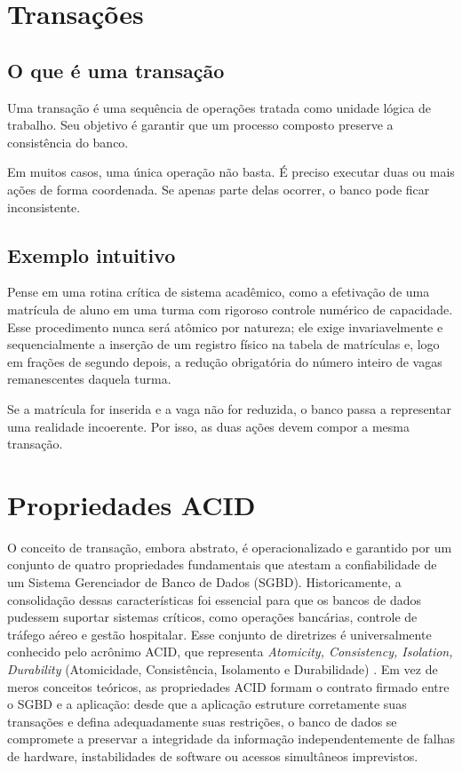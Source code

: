 \section{Transações}

\subsection{O que é uma transação}

Uma transação é uma sequência de operações tratada como unidade lógica de trabalho. Seu objetivo é garantir que um processo composto preserve a consistência do banco.

Em muitos casos, uma única operação não basta. É preciso executar duas ou mais ações de forma coordenada. Se apenas parte delas ocorrer, o banco pode ficar inconsistente.

\subsection{Exemplo intuitivo}

Pense em uma rotina crítica de sistema acadêmico, como a efetivação de uma matrícula de aluno em uma turma com rigoroso controle numérico de capacidade. Esse procedimento nunca será atômico por natureza; ele exige invariavelmente e sequencialmente a inserção de um registro físico na tabela de matrículas e, logo em frações de segundo depois, a redução obrigatória do número inteiro de vagas remanescentes daquela turma.

Se a matrícula for inserida e a vaga não for reduzida, o banco passa a representar uma realidade incoerente. Por isso, as duas ações devem compor a mesma transação.

\section{Propriedades ACID}

O conceito de transação, embora abstrato, é operacionalizado e garantido por um conjunto de quatro propriedades fundamentais que atestam a confiabilidade de um Sistema Gerenciador de Banco de Dados (SGBD). Historicamente, a consolidação dessas características foi essencial para que os bancos de dados pudessem suportar sistemas críticos, como operações bancárias, controle de tráfego aéreo e gestão hospitalar. Esse conjunto de diretrizes é universalmente conhecido pelo acrônimo ACID, que representa \textit{Atomicity, Consistency, Isolation, Durability} (Atomicidade, Consistência, Isolamento e Durabilidade) \cite{ramakrishnan2011}. Em vez de meros conceitos teóricos, as propriedades ACID formam o contrato firmado entre o SGBD e a aplicação: desde que a aplicação estruture corretamente suas transações e defina adequadamente suas restrições, o banco de dados se compromete a preservar a integridade da informação independentemente de falhas de hardware, instabilidades de software ou acessos simultâneos imprevistos.

